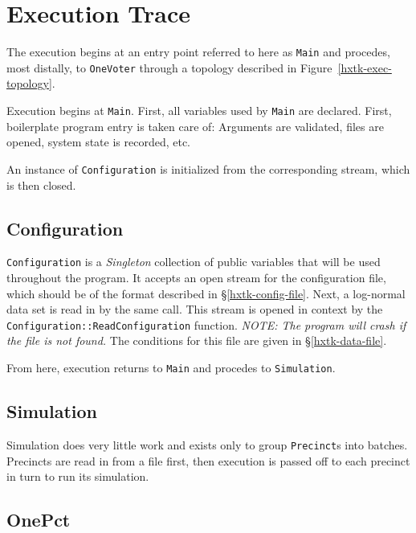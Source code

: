 %

\chapter{Execution Trace}

The execution begins at an entry point referred to here as \texttt{Main} and procedes, most distally, to \texttt{OneVoter} through a topology described in Figure~\ref{hxtk-exec-topology}.

Execution begins at \texttt{Main}. First, all variables used by \texttt{Main} are declared. First, boilerplate program entry is taken care of: Arguments are validated, files are opened, system state is recorded, etc.

An instance of \texttt{Configuration} is initialized from the corresponding stream, which is then closed.

\section{Configuration}

\texttt{Configuration} is a \emph{Singleton} collection of public variables that will be used throughout the program. It accepts an open stream for the configuration file, which should be of the format described in \S\ref{hxtk-config-file}. Next, a log-normal data set is read in by the same call. This stream is opened in context by the \texttt{Configuration::ReadConfiguration} function. \emph{NOTE: The program will crash if the file is not found.} The conditions for this file are given in \S\ref{hxtk-data-file}.

From here, execution returns to \texttt{Main} and procedes to \texttt{Simulation}.

\section{Simulation}

Simulation does very little work and exists only to group \texttt{Precinct}s into batches. Precincts are read in from a file first, then execution is passed off to each precinct in turn to run its simulation.

\section{OnePct}

